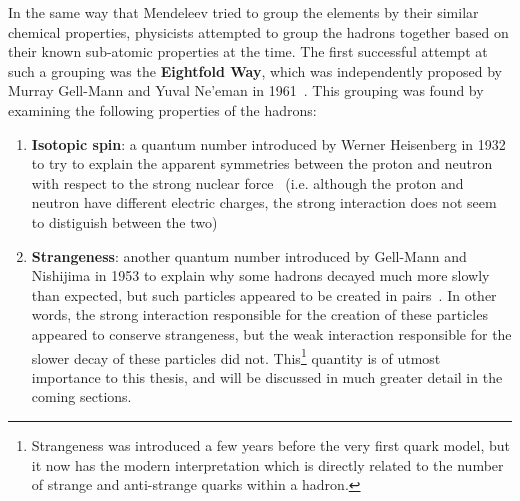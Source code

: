 In the same way that Mendeleev tried to group the elements by their similar chemical properties, physicists attempted to group the hadrons together based on their known sub-atomic properties at the time. The first successful attempt at such a grouping was the \textbf{Eightfold Way}, which was independently proposed by Murray Gell-Mann and Yuval Ne'eman in 1961~\cite{GellMannEightfold, NeemanEightfold}. This grouping was found by examining the following properties of the hadrons:
%
\begin{enumerate}
    \item \textbf{Isotopic spin}: a quantum number introduced by Werner Heisenberg in 1932 to try to explain the apparent symmetries between the proton and neutron with respect to the strong nuclear force~\cite{IsotopicSpin} (i.e. although the proton and neutron have different electric charges, the strong interaction does not seem to distiguish between the two)
    \item \textbf{Strangeness}: another quantum number introduced by Gell-Mann and Nishijima in 1953 to explain why some hadrons decayed much more slowly than expected, but such particles appeared to be created in pairs~\cite{Strangeness}. In other words, the strong interaction responsible for the creation of these particles appeared to conserve strangeness, but the weak interaction responsible for the slower decay of these particles did not. This\footnote{Strangeness was introduced a few years before the very first quark model, but it now has the modern interpretation which is directly related to the number of strange and anti-strange quarks within a hadron.} quantity is of utmost importance to this thesis, and will be discussed in much greater detail in the coming sections.
\end{enumerate}
%

